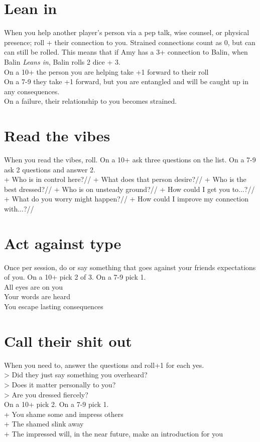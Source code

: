 \documentclass[letterpaper]{twentysecondcv} %
\begin{document}
\section{Lean in}
When you help another player's person via a pep talk, wise counsel, or physical presence; roll + their connection to you. Strained connections count as 0, but can can still be rolled.
This means that if Amy has a 3+ connection to Balin, when Balin \emph{Leans in}, Balin rolls 2 dice + 3. \\
On a 10+ the person you are helping take +1 forward to their roll\\
On a 7-9 they take +1 forward, but you are entangled and will be caught up in any consequences. \\
On a failure, their relationship to you becomes strained.\\
 
\section{Read the vibes}
When you read the vibes, roll. 
On a 10+ ask three questions on the list. On a 7-9 ask 2 questions and answer 2.\\
+ Who is in control here?//
+ What does that person desire?//
+ Who is the best dressed?//
+ Who is on unsteady ground?//
+ How could I get you to...?//
+ What do you worry might happen?//
+ How could I improve my connection with...?//

\section{Act against type}
Once per session, do or say something that goes against your friends expectations of you. 
On a 10+ pick 2 of 3. On a 7-9 pick 1.\\
All eyes are on you\\
Your words are heard\\
You escape lasting consequences\\

\section{Call their shit out}
When you need to, answer the questions and roll+1 for each yes. \\
> Did they just say something you overheard?\\
> Does it matter personally to you?\\
> Are you dressed fiercely?\\
On a 10+ pick 2. On a 7-9 pick 1.\\
+ You shame some and impress others\\
+ The shamed slink away\\
+ The impressed will, in the near future, make an introduction for you\\
\end{document}
